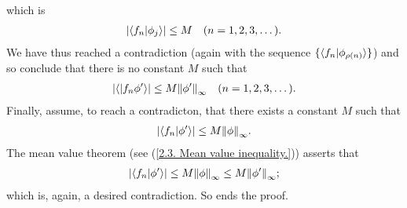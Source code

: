 %
which is %
%
  \begin{align}
    \lvert
      \langle{f_n}\lvert{\phi_j}\rangle
    \rvert 
      \leq 
    M 
    \quad (n=1, 2, 3, \dots).
  \end{align}
%
We have thus reached a contradiction (again with the sequence %
%
  $\{\langle f_n\lvert \phi_{\rho(n)} \rangle\}$) %
%
and so conclude that there is no constant $M$ such that %
%
  \begin{align}
    \lvert 
      \langle \lvert f_n \phi'\rangle
    \rvert 
      \leq 
    M \norm{\phi'}_{\infty}
    \quad (n=1, 2, 3, \dots).
  \end{align}
%
Finally, assume, to reach a contradicton, that %
there exists a constant $M$ such that 
%
  \begin{align}
    \lvert \langle f_n \lvert \phi' \rangle \rvert 
      \leq 
    M \norm{\phi}_{\infty}.
  \end{align}
%
The mean value theorem (see (\ref{2.3. Mean value inequality.})) asserts that %
%
  \begin{align}
    \lvert \langle f_n \lvert \phi' \rangle \rvert 
      \leq 
    M \norm{\phi}_{\infty} 
      \leq 
    M \norm{\phi'}_{\infty}; 
  \end{align}
%
which is, again, a desired contradiction. So ends the proof.

